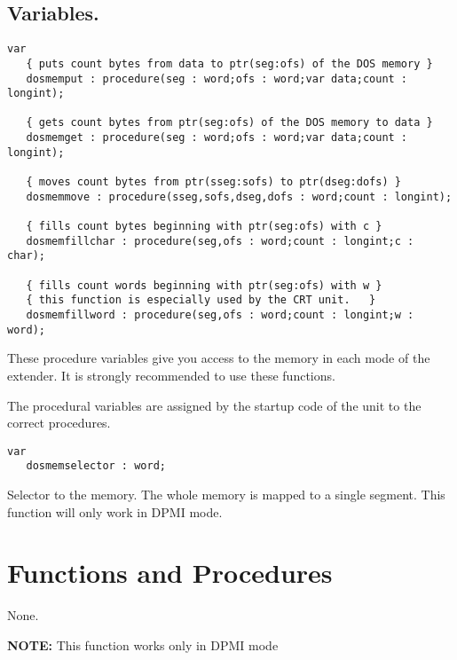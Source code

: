 \subsection{Variables.}
\begin{verbatim}
var
   { puts count bytes from data to ptr(seg:ofs) of the DOS memory }
   dosmemput : procedure(seg : word;ofs : word;var data;count : longint);

   { gets count bytes from ptr(seg:ofs) of the DOS memory to data }
   dosmemget : procedure(seg : word;ofs : word;var data;count : longint);

   { moves count bytes from ptr(sseg:sofs) to ptr(dseg:dofs) }
   dosmemmove : procedure(sseg,sofs,dseg,dofs : word;count : longint);

   { fills count bytes beginning with ptr(seg:ofs) with c }
   dosmemfillchar : procedure(seg,ofs : word;count : longint;c : char);

   { fills count words beginning with ptr(seg:ofs) with w }
   { this function is especially used by the CRT unit.   }
   dosmemfillword : procedure(seg,ofs : word;count : longint;w : word);
\end{verbatim}
These procedure variables give you access to the \dos memory in each mode
of the \dos extender. It is strongly recommended to use these functions.

The procedural variables are assigned by the startup code of the 
unit to the correct procedures.
\begin{verbatim}
var
   dosmemselector : word;
\end{verbatim}
Selector to the \dos memory. The whole \dos memory is mapped to a
single segment. This function will only work in DPMI mode.

\section{Functions and Procedures}
{None.}{}
\par {\bf NOTE: }This
function works only in DPMI mode\par 


{} 

